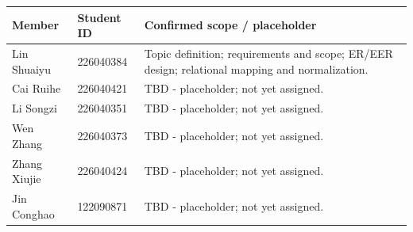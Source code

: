 \documentclass[11pt,a4paper]{article}
\begin{document}
\par\begingroup\small\noindent
\begin{tabularx}{\linewidth}{p{2.7cm}p{3cm}X}
\toprule
Member & Student ID & Confirmed scope / placeholder\\\midrule
Lin Shuaiyu & 226040384 & Topic definition; requirements and scope; ER/EER design; relational mapping and normalization.\\
Cai Ruihe & 226040421 & TBD - placeholder; not yet assigned.\\
Li Songzi & 226040351 & TBD - placeholder; not yet assigned.\\
Wen Zhang & 226040373 & TBD - placeholder; not yet assigned.\\
Zhang Xiujie & 226040424 & TBD - placeholder; not yet assigned.\\
Jin Conghao & 122090871 & TBD - placeholder; not yet assigned.\\
\bottomrule
\end{tabularx}
\par\endgroup
\end{document}
